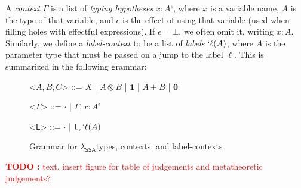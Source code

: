 \documentclass[acmsmall,screen,review]{acmart}
\newcounter{todos}
\newcommand{\TODO}[1]{{
  \stepcounter{todos}
  \begin{center}\large{\textcolor{red}{\textbf{TODO \arabic{todos}:} #1}}\end{center}
}}
\newcommand{\ms}[1]{\ensuremath{\mathsf{#1}}}
\newcommand{\lbl}[1]{{`#1}}
\newcommand{\thyp}[3]{#1 : {#2}^{#3}}
\newcommand{\bhyp}[2]{#1 : #2}
\newcommand{\lhyp}[2]{#1(#2)}
\newcommand{\llhyp}[2]{\lhyp{\lbl{#1}}{#2}}
\newcommand{\isotopessa}{\(\lambda_{\ms{SSA}}\)}
\begin{document}
A \textit{context} $\Gamma$ is a list of \textit{typing hypotheses} $\thyp{x}{A}{\epsilon}$, where
$x$ is a variable name, $A$ is the type of that variable, and $\epsilon$ is the effect of using that
variable (used when filling holes with effectful expressions). If $\epsilon = \bot$, we often omit
it, writing $\bhyp{x}{A}$. Similarly, we define a \textit{label-context} to be a list of
\textit{labels} $\llhyp{\ell}{A}$, where $A$ is the parameter type that must be passed on a jump to
the label $\ell$. This is summarized in the following grammar:

\begin{figure}[H]
  \begin{center}
    \begin{minipage}{.5\textwidth}
      \begin{grammar}
        <\(A, B, C\)> ::= 
        \(X\)
        \;|\; \(A \otimes B\)
        \;|\; \(\mathbf{1}\)
        \;|\; \(A + B\)
        \;|\; \(\mathbf{0}\)
      \end{grammar}
    \end{minipage}%
    \begin{minipage}{.25\textwidth}
      \begin{grammar}
        <\(\Gamma\)> ::= \(\cdot\) \;|\; \(\Gamma, \thyp{x}{A}{\epsilon}\)
      \end{grammar}
    \end{minipage}%
    \begin{minipage}{.25\textwidth}
      \begin{grammar}
        <\(\ms{L}\)> ::= \(\cdot\) \;|\; \(\ms{L}, \llhyp{\ell}{A}\)
      \end{grammar}
    \end{minipage}
  \end{center}
  \caption{Grammar for \isotopessa types, contexts, and label-contexts}
  \label{fig:ssa-ty-grammar}
  \Description{}
\end{figure}

\TODO{text, insert figure for table of judgements and metatheoretic judgements?}
\end{document}
